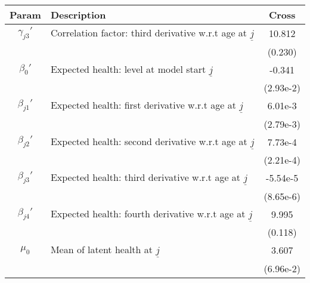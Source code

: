\begin{table}[ht]\label{CrossWomenHealthParams}
\footnotesize
\begin{center}
\begin{tabular}{clc}
\hline \hline
Param & Description & Cross \\
\hline
$\gamma_{j3}'$ & Correlation factor: third derivative w.r.t age at $\underline{j}$ & 10.812 \\
 & & (0.230) \\
$\beta_{0}'$ & Expected health: level at model start $\underline{j}$ & -0.341 \\
 & & (2.93e-2) \\
$\beta_{j1}'$ & Expected health: first derivative w.r.t age at $\underline{j}$ & 6.01e-3 \\
 & & (2.79e-3) \\
$\beta_{j2}'$ & Expected health: second derivative w.r.t age at $\underline{j}$ & 7.73e-4 \\
 & & (2.21e-4) \\
$\beta_{j3}'$ & Expected health: third derivative w.r.t age at $\underline{j}$ & -5.54e-5 \\
 & & (8.65e-6) \\
$\beta_{j4}'$ & Expected health: fourth derivative w.r.t age at $\underline{j}$ & 9.995 \\
 & & (0.118) \\
$\mu_0$ & Mean of latent health at $\underline{j}$ & 3.607 \\
 & & (6.96e-2) \\
\hline\hline
\end{tabular}
\end{center}
\end{table}

